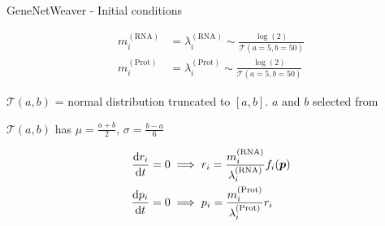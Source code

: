 
\begin{frame}{GeneNetWeaver - Initial conditions}

\begin{subequations}
\label{eq:gnw_param_initial}
\begin{align}
m_i^{(\text{RNA})} &= \lambda_i^{(\text{RNA})} \sim \frac{\log (2)}{\mathcal{T}(a=5, b=50)} \\
m_i^{(\text{Prot})} &= \lambda_i^{(\text{Prot})} \sim \frac{\log (2)}{\mathcal{T}(a=5, b=50)}
\end{align}
\end{subequations}

$\mathcal{T}(a,b)$ = normal distribution truncated to $[a,b]$. $a$ and $b$ selected from~\cite{GeneNetWeaverModel}


$\mathcal{T}(a,b)$ has $\mu=\frac{a+b}{2}$, $\sigma=\frac{b-a}{6}$






\begin{subequations}
\label{eq:initial_gnw}
\begin{align}
\dv{r_i}{t} = 0 &\implies r_i = \frac{m_i^{(\text{RNA})}}{\lambda_i^{(\text{RNA})}}  f_i(\boldsymbol{p})  \\
\dv{p_i}{t} = 0 &\implies p_i = \frac{m_i^{(\text{Prot})}}{\lambda_i^{(\text{Prot})}} r_i
\end{align}
\end{subequations}



\end{frame}
